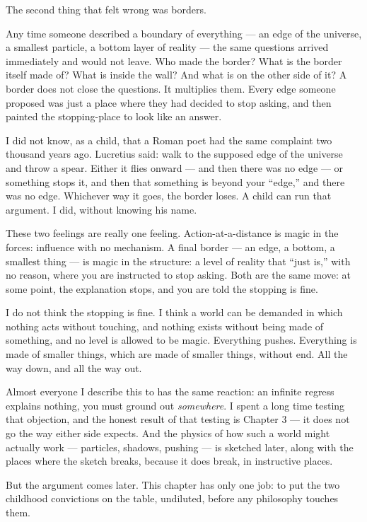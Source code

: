 \documentclass[fontsize=11pt,paper=a4,pagesize=auto,parskip=half-]{scrbook}
\begin{document}
The second thing that felt wrong was borders.

Any time someone described a boundary of everything --- an edge of the universe, a smallest particle, a bottom layer of reality --- the same questions arrived immediately and would not leave. Who made the border? What is the border itself made of? What is inside the wall? And what is on the other side of it? A border does not close the questions. It multiplies them. Every edge someone proposed was just a place where they had decided to stop asking, and then painted the stopping-place to look like an answer.

I did not know, as a child, that a Roman poet had the same complaint two thousand years ago. Lucretius said: walk to the supposed edge of the universe and throw a spear. Either it flies onward --- and then there was no edge --- or something stops it, and then that something is beyond your ``edge,'' and there was no edge. Whichever way it goes, the border loses. A child can run that argument. I did, without knowing his name.

These two feelings are really one feeling. Action-at-a-distance is magic in the forces: influence with no mechanism. A final border --- an edge, a bottom, a smallest thing --- is magic in the structure: a level of reality that ``just is,'' with no reason, where you are instructed to stop asking. Both are the same move: at some point, the explanation stops, and you are told the stopping is fine.

I do not think the stopping is fine. I think a world can be demanded in which nothing acts without touching, and nothing exists without being made of something, and no level is allowed to be magic. Everything pushes. Everything is made of smaller things, which are made of smaller things, without end. All the way down, and all the way out.

Almost everyone I describe this to has the same reaction: an infinite regress explains nothing, you must ground out \emph{somewhere}. I spent a long time testing that objection, and the honest result of that testing is Chapter 3 --- it does not go the way either side expects. And the physics of how such a world might actually work --- particles, shadows, pushing --- is sketched later, along with the places where the sketch breaks, because it does break, in instructive places.

But the argument comes later. This chapter has only one job: to put the two childhood convictions on the table, undiluted, before any philosophy touches them.
\end{document}
